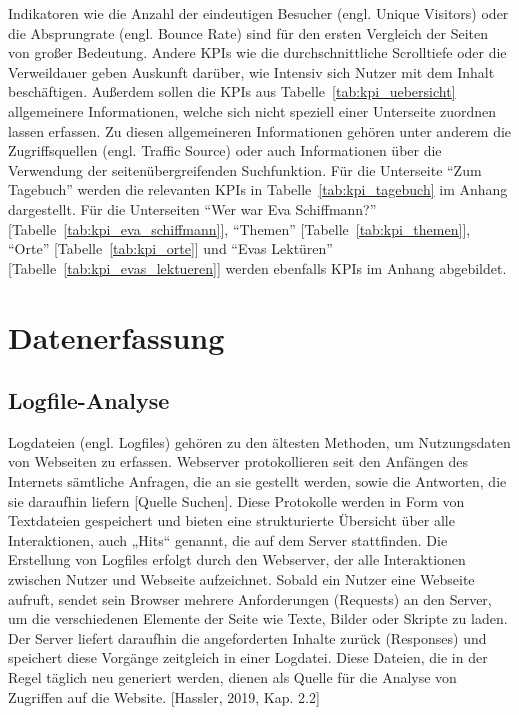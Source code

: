 Indikatoren wie die Anzahl der eindeutigen Besucher (engl. Unique Visitors) oder die Absprungrate (engl. Bounce Rate) sind für den ersten Vergleich der Seiten von großer Bedeutung. Andere KPIs wie die durchschnittliche Scrolltiefe oder die Verweildauer geben Auskunft darüber, wie Intensiv sich Nutzer mit dem Inhalt beschäftigen. Außerdem sollen die KPIs aus Tabelle~\ref{tab:kpi_uebersicht} allgemeinere Informationen, welche sich nicht speziell einer Unterseite zuordnen lassen erfassen. Zu diesen allgemeineren Informationen gehören unter anderem die Zugriffsquellen (engl. Traffic Source) oder auch Informationen über die Verwendung der seitenübergreifenden Suchfunktion. Für die Unterseite ``Zum Tagebuch'' werden die relevanten KPIs in Tabelle~\ref{tab:kpi_tagebuch} im Anhang dargestellt. Für die Unterseiten ``Wer war Eva Schiffmann?'' [Tabelle~\ref{tab:kpi_eva_schiffmann}], ``Themen'' [Tabelle~\ref{tab:kpi_themen}], ``Orte'' [Tabelle~\ref{tab:kpi_orte}] und ``Evas Lektüren'' [Tabelle~\ref{tab:kpi_evas_lektueren}] werden ebenfalls KPIs im Anhang abgebildet.


\section{Datenerfassung} %

\subsection{Logfile-Analyse}
Logdateien (engl. Logfiles) gehören zu den ältesten Methoden, um Nutzungsdaten von Webseiten zu erfassen. Webserver protokollieren seit den Anfängen des Internets sämtliche Anfragen, die an sie gestellt werden, sowie die Antworten, die sie daraufhin liefern [Quelle Suchen]. Diese Protokolle werden in Form von Textdateien gespeichert und bieten eine strukturierte Übersicht über alle Interaktionen, auch „Hits“ genannt, die auf dem Server stattfinden. Die Erstellung von Logfiles erfolgt durch den Webserver, der alle Interaktionen zwischen Nutzer und Webseite aufzeichnet. Sobald ein Nutzer eine Webseite aufruft, sendet sein Browser mehrere Anforderungen (Requests) an den Server, um die verschiedenen Elemente der Seite wie Texte, Bilder oder Skripte zu laden. Der Server liefert daraufhin die angeforderten Inhalte zurück (Responses) und speichert diese Vorgänge zeitgleich in einer Logdatei. Diese Dateien, die in der Regel täglich neu generiert werden, dienen als Quelle für die Analyse von Zugriffen auf die Website. [Hassler, 2019, Kap. 2.2] 

